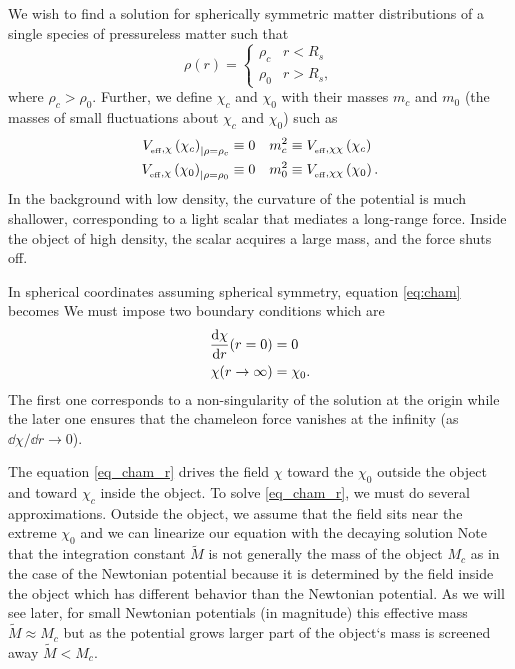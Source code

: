We wish to find a solution for spherically symmetric matter distributions of a single species of pressureless matter such that
\begin{equation*}
\rho(r)=
\begin{cases}
\rho_c & r<R_s \\
\rho_0 & r>R_s,
\end{cases}
\end{equation*}
where $\rho_c>\rho_0$. Further, we define $\chi_c$ and $\chi_0$ with their masses $m_c$ and $m_0$ (the masses of small fluctuations about $\chi_c$ and $\chi_0$) such as
\begin{align*}
V_{_\text{\tiny eff},\chi}\left(\chi_c\right)_{|\rho=\rho_c}&\equiv0	&	m^2_c&\equiv V_{_\text{\tiny eff},\chi\chi}\left(\chi_c\right) \\
V_{_\text{\tiny eff},\chi}\left(\chi_0\right)_{|\rho=\rho_0}&\equiv0	&	m^2_0&\equiv V_{_\text{\tiny eff},\chi\chi}\left(\chi_0\right).
\end{align*}
In the background with low density, the curvature of the potential is much shallower, corresponding to a light scalar that mediates a long-range force. Inside the object of high density, the scalar acquires a large mass, and the force shuts off.

In spherical coordinates assuming spherical symmetry, equation \eqref{eq:cham} becomes
We must impose two boundary conditions which are
\begin{align*}
\frac{\mbox{d} \chi}{\mbox{d} r}(r=0)&=0 \\
\chi(r\rightarrow\infty)&=\chi_0.
\end{align*}
The first one corresponds to a non-singularity of the solution at the origin while the later one ensures that the chameleon force vanishes at the infinity (as $\dd\chi/\dd r\rightarrow0$).

The equation \eqref{eq_cham_r} drives the field $\chi$ toward the $\chi_0$ outside the object and toward $\chi_c$ inside the object. To solve \eqref{eq_cham_r}, we must do several approximations. Outside the object, we assume that the field sits near the extreme $\chi_0$ and we can linearize our equation
with the decaying solution
Note that the integration constant $\tilde{M}$ is not generally the mass of the object $M_c$ as in the case of the Newtonian potential because it is determined by the field inside the object which has different behavior than the Newtonian potential. As we will see later, for small Newtonian potentials (in magnitude) this effective mass $\tilde{M}\approx M_c$ but as the potential grows larger part of the object`s mass is screened away $\tilde{M}< M_c$.

